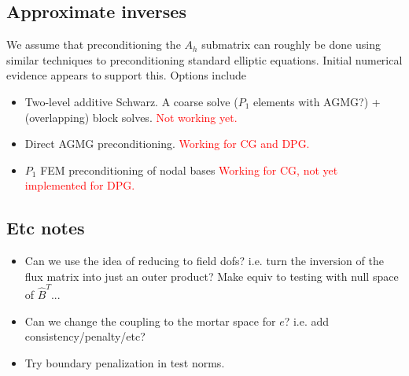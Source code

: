 \documentclass{article}
\begin{document}
\subsection{Approximate inverses}

We assume that preconditioning the $A_h$ submatrix can roughly be done using similar techniques to preconditioning standard elliptic equations.  Initial numerical evidence appears to support this.  Options include
\begin{itemize}
\item Two-level additive Schwarz.  A coarse solve ($P_1$ elements with AGMG?) + (overlapping) block solves.  \textcolor{red}{Not working yet.}
\item Direct AGMG preconditioning.  \textcolor{red}{Working for CG and DPG.}
\item $P_1$ FEM preconditioning of nodal bases \textcolor{red}{Working for CG, not yet implemented for DPG.}
\end{itemize}

\subsection{Etc notes}
\begin{itemize}
\item Can we use the idea of reducing to field dofs?  i.e. turn the inversion of the flux matrix into just an outer product?  Make equiv to testing with null space of $\hat{B}^T$...
\item Can we change the coupling to the mortar space for $e$?  i.e. add consistency/penalty/etc?
\item Try boundary penalization in test norms.  
\end{itemize}
\end{document}
